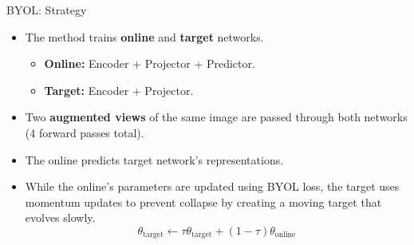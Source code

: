 \documentclass{beamer}
\begin{document}
\begin{frame}{BYOL: Strategy}
  \begin{itemize}
  \item The method trains \textbf{online} and \textbf{target} networks.
    \begin{itemize}
    \item \textbf{Online:} Encoder + Projector + \alert{Predictor}.
    \item \textbf{Target:} Encoder + Projector.
    \end{itemize}    
    \vspace{0.5cm}
  \item Two \textbf{augmented views} of the same image are passed through \alert{both networks} (4 forward passes total). 
    \vspace{0.5cm}
  \item The online  \alert{predicts} target network's representations.
    \vspace{0.5cm}
  \item While the online's parameters are updated using \alert{BYOL
    loss}, the target uses \alert{momentum} updates to prevent
    collapse by creating a \alert{moving target} that evolves slowly.
$$\theta_{\text{target}} \leftarrow \tau \theta_{\text{target}} + (1-\tau) \theta_{\text{online}}$$
  \end{itemize}
\end{frame}
\end{document}
